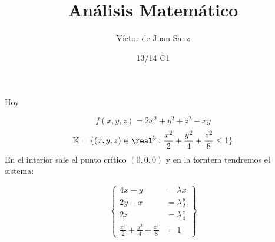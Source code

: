 \documentclass{apuntes}
\title{Análisis Matemático}
\author{Víctor de Juan Sanz}
\date{13/14 C1}
\begin{document}
%
%

Hoy

\begin{problem}[15.b]
\[f(x,y,z) = 2x^2+y^2+z^2-xy\]
\[\mathbb{K} = \{ (x,y,z)\in \real^3 : \frac{x^2}{2} + \frac{y^2}{4} + \frac{z^2}{8} \leq 1\}\]
\solution
En el interior sale el punto crítico $(0,0,0)$ y en la forntera tendremos el sistema:

\[\left\{\begin{array}{cc}
4x-y&=\lambda x\\
2y-x &=\lambda \frac{y}{2}\\
2z &= \lambda\frac{z}{4}\\
\frac{x^2}{2}+\frac{y^2}{4} + \frac{z^2}{8} &=1
\end{array}\right\}\]
\end{problem}
\end{document}
